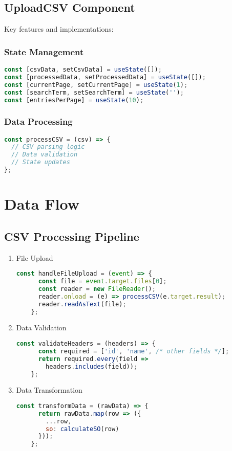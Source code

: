 \documentclass[12pt,a4paper]{article}
\begin{document}
\subsection{UploadCSV Component}
Key features and implementations:

\subsubsection{State Management}
\begin{lstlisting}[language=JavaScript]
const [csvData, setCsvData] = useState([]);
const [processedData, setProcessedData] = useState([]);
const [currentPage, setCurrentPage] = useState(1);
const [searchTerm, setSearchTerm] = useState('');
const [entriesPerPage] = useState(10);
\end{lstlisting}

\subsubsection{Data Processing}
\begin{lstlisting}[language=JavaScript]
const processCSV = (csv) => {
  // CSV parsing logic
  // Data validation
  // State updates
};
\end{lstlisting}

\section{Data Flow}

\subsection{CSV Processing Pipeline}
\begin{enumerate}
    \item File Upload
    \begin{lstlisting}[language=JavaScript]
    const handleFileUpload = (event) => {
      const file = event.target.files[0];
      const reader = new FileReader();
      reader.onload = (e) => processCSV(e.target.result);
      reader.readAsText(file);
    };
    \end{lstlisting}

    \item Data Validation
    \begin{lstlisting}[language=JavaScript]
    const validateHeaders = (headers) => {
      const required = ['id', 'name', /* other fields */];
      return required.every(field => 
        headers.includes(field));
    };
    \end{lstlisting}

    \item Data Transformation
    \begin{lstlisting}[language=JavaScript]
    const transformData = (rawData) => {
      return rawData.map(row => ({
        ...row,
        so: calculateSO(row)
      }));
    };
    \end{lstlisting}
\end{enumerate}
\end{document}
